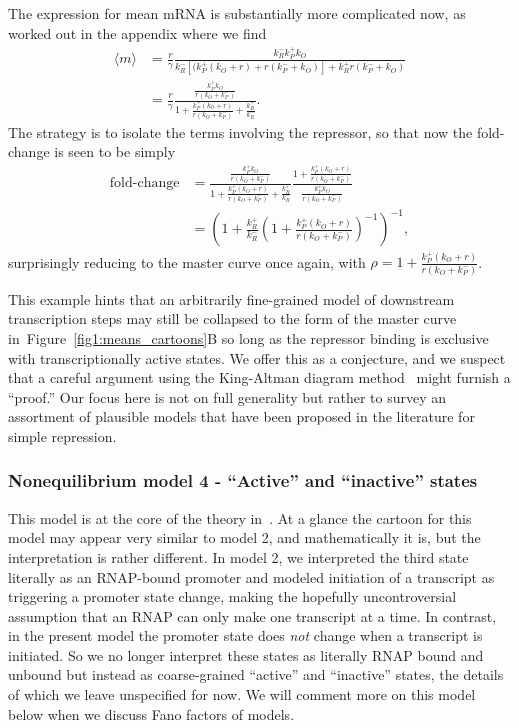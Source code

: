 \documentclass[12pt]{article}%
\newcommand{\fig}[1]{Figure~\ref{#1}}
\begin{document}
The expression for mean mRNA is substantially more complicated
now, as worked out in the appendix where we find
\begin{align}
\langle m\rangle &= \frac{r}{\gamma}
        \frac{k_R^- k_P^+ k_O}
        {k_R^- [(k_P^+ (k_O + r) + r(k_P^- + k_O)] + k_R^+ r(k_P^- + k_O)}
\\
&= \frac{r}{\gamma}
\frac{\frac{k_P^+ k_O}{r(k_O + k_P^-)}}
        {1 + \frac{k_P^+ (k_O + r)}{r(k_O + k_P^-)} + \frac{k_R^+}{k_R^-}}.
\end{align}
The strategy is to isolate the terms involving the repressor, so that now the fold-change is seen to be simply
\begin{align}
\text{fold-change}
&= \frac{\frac{k_P^+ k_O}{r(k_O + k_P^-)}}
        {1 + \frac{k_P^+ (k_O + r)}{r(k_O + k_P^-)} + \frac{k_R^+}{k_R^-}}
        \frac{1 + \frac{k_P^+ (k_O + r)}{r(k_O + k_P^-)}}
                {\frac{k_P^+ k_O}{r(k_O + k_P^-)}}
\\
&= \left(
        1 + \frac{k_R^+}{k_R^-}
        \left(1 + \frac{k_P^+ (k_O + r)}{r(k_O + k_P^-)}\right)^{-1}
\right)^{-1},
\end{align}
surprisingly reducing to the master curve once again, with
$\rho = 1 + \frac{k_P^+ (k_O + r)}{r(k_O + k_P^-)}$.

This example hints that an arbitrarily fine-grained model of
downstream transcription steps may still be collapsed to the form
of the master curve in~\fig{fig1:means_cartoons}B so long as the
repressor binding is exclusive with transcriptionally active
states. We offer this as a conjecture, and we suspect that a
careful argument using the King-Altman diagram
method~\cite{King1956, Hill1966} might furnish a ``proof.''
Our focus here is not on full generality but rather to survey an
assortment of plausible models that have been proposed in the
literature for simple repression.

\subsubsection{Nonequilibrium model 4 - ``Active'' and ``inactive'' states}
This model is at the core of the theory in~\cite{Razo-Mejia2020}.
At a glance the cartoon for this model may appear very similar to model 2,
and mathematically it is, but the interpretation is rather different.
In model 2, we interpreted the third state literally as an
RNAP-bound promoter and modeled initiation of a transcript as
triggering a promoter state change, making the hopefully
uncontroversial assumption that an RNAP can only make one
transcript at a time. In contrast, in the present model the
promoter state does \textit{not} change when a transcript is
initiated. So we no longer interpret these states as literally
RNAP bound and unbound but instead as coarse-grained ``active''
and ``inactive'' states, the details of which we leave
unspecified for now. We will comment more on this model below
when we discuss Fano factors of models.
\end{document}
